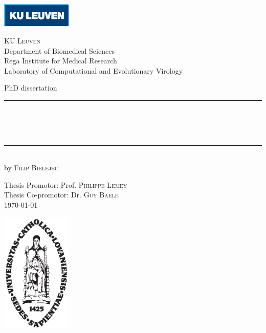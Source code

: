 \begin{titlepage}
	\begin{addmargin}[-1cm]{-3cm}
    \begin{center}
    
    
    \hspace{0.75\textwidth} \includegraphics[width=0.25\textwidth]{figures/kuleuven}
    
        \large
        {\Large \textsc{KU Leuven}}\\[1ex]
        Department of Biomedical Sciences\\
        Rega Institute for Medical Research\\
        Laboratory of Computational and Evolutionary Virology 

        \vfill

        PhD dissertation\\ \vskip1cm
        \rule{14cm}{0.4pt}\\ \bigskip
        \begingroup
            \Large
            \color{maroon}\spacedallcaps{\myTitle} \\ \bigskip
        \endgroup
        \spacedlowsmallcaps{\mySubtitle} \\ \bigskip
        \rule{14cm}{0.4pt}\\ \vskip1cm
        by \textsc{Filip Bielejec}

        \vfill
        \vfill
        \vfill

        \hfill Thesis Promotor: Prof. \textsc{Philippe Lemey}\\
        \hfill Thesis Co-promotor: Dr. \textsc{Guy Baele}\\
        \hfill \today
    \end{center}
    \vspace{-3.5cm}\includegraphics[width=0.25\textwidth]{figures/sedes}
  \end{addmargin}
\end{titlepage}
